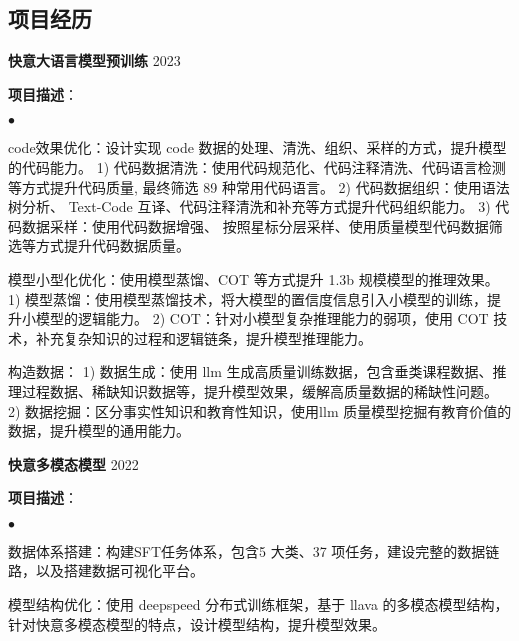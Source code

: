 \documentclass[margin,line]{res}
\newenvironment{list2}{
  \begin{list}{$\bullet$}{%
      \setlength{\itemsep}{0in}
      \setlength{\parsep}{0in} \setlength{\parskip}{0in}
      \setlength{\topsep}{0in} \setlength{\partopsep}{0in}
      \setlength{\leftmargin}{0.2in}}}{\end{list}}
\begin{document}
\begin{resume}
	\section{\sc 项目经历}
	\textbf{快意大语言模型预训练} \hfill{2023}
	\begin{description}
		\item \textbf{项目描述}：
		      \begin{list2}
			      \item code效果优化：设计实现 code 数据的处理、清洗、组织、采样的方式，提升模型的代码能力。
				  	1) 代码数据清洗：使用代码规范化、代码注释清洗、代码语言检测等方式提升代码质量, 最终筛选 89 种常用代码语言。
					2) 代码数据组织：使用语法树分析、 Text-Code 互译、代码注释清洗和补充等方式提升代码组织能力。
					3) 代码数据采样：使用代码数据增强、 按照星标分层采样、使用质量模型代码数据筛选等方式提升代码数据质量。
			      \item 模型小型化优化：使用模型蒸馏、COT 等方式提升 1.3b 规模模型的推理效果。
				  	1) 模型蒸馏：使用模型蒸馏技术，将大模型的置信度信息引入小模型的训练，提升小模型的逻辑能力。
					2) COT：针对小模型复杂推理能力的弱项，使用 COT 技术，补充复杂知识的过程和逻辑链条，提升模型推理能力。
			      \item 构造数据：
				  	1) 数据生成：使用 llm 生成高质量训练数据，包含垂类课程数据、推理过程数据、稀缺知识数据等，提升模型效果，缓解高质量数据的稀缺性问题。
					2) 数据挖掘：区分事实性知识和教育性知识，使用llm 质量模型挖掘有教育价值的数据，提升模型的通用能力。
		      \end{list2}
	\end{description}

	\textbf{快意多模态模型} \hfill{2022}
	\begin{description}
		\item \textbf{项目描述}：
		      \begin{list2}
			      \item 数据体系搭建：构建SFT任务体系，包含5 大类、37 项任务，建设完整的数据链路，以及搭建数据可视化平台。
			      \item 模型结构优化：使用 deepspeed 分布式训练框架，基于 llava 的多模态模型结构，针对快意多模态模型的特点，设计模型结构，提升模型效果。
		      \end{list2}
	\end{description}


\end{resume}
\end{document}
